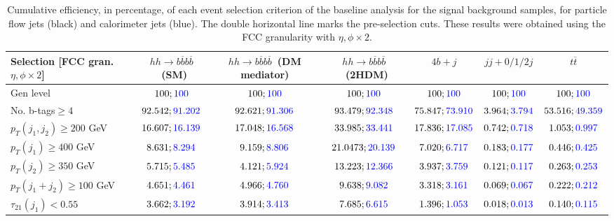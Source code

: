 \begin{landscape}
		\begin{table}
			\centering
			\caption{Cumulative efficiency, in percentage, of each event selection criterion of the baseline analysis for the signal background samples, for particle flow jets (black) and calorimeter jets (blue). The double horizontal line marks the pre-selection cuts. These results were obtained using the FCC granularity with $\eta,\phi\times 2$.}
			\begin{tabular}{lcccccc}
				\toprule 
				\textbf{Selection [FCC gran. $\eta,\phi\times2$]} & $hh\rightarrow b\overline{b}b\overline{b}$~(SM) & $hh\rightarrow b\overline{b}b\overline{b}$~(DM mediator) & $hh\rightarrow b\overline{b}b\overline{b}$~(2HDM) & $4b+j$  & $jj+0/1/2 j$ & $t\overline{t}$ \\
				\midrule
				Gen level & $100;\textcolor{blue}{100}$ & $100;\textcolor{blue}{100}$ &$100;\textcolor{blue}{100}$& $100;\textcolor{blue}{100}$& $100;\textcolor{blue}{100}$& $100;\textcolor{blue}{100}$ \\
				\rowcolor{black!7}No. b-tags$\geq 4$&$92.542;\textcolor{blue}{91.202}$&$92.621;\textcolor{blue}{91.306}$&$93.479;\textcolor{blue}{92.348}$&$75.847;\textcolor{blue}{73.910}$&$3.964;\textcolor{blue}{3.794}$&$53.516;\textcolor{blue}{49.359}$\\
				$p_T(j_1,j_2)\geq200$ GeV & $16.607;\textcolor{blue}{16.139}$ & $17.048;\textcolor{blue}{16.568}$&$33.985;\textcolor{blue}{33.441}$ &$17.836;\textcolor{blue}{17.085}$&$0.742;\textcolor{blue}{0.718}$&$1.053;\textcolor{blue}{0.997}$\\
				\midrule \midrule
				\rowcolor{black!7}$p_T(j_1)\geq 400$ GeV & $8.631;\textcolor{blue}{8.294}$ &$9.159;\textcolor{blue}{8.806}$  &$21.0473;\textcolor{blue}{20.139}$&$7.020;\textcolor{blue}{6.717}$&$0.183;\textcolor{blue}{0.177}$&$0.446;\textcolor{blue}{0.425}$\\ 
				$p_T(j_2)\geq 350$ GeV & $5.715;\textcolor{blue}{5.485}$& $4.121;\textcolor{blue}{5.924}$&$13.223;\textcolor{blue}{12.366}$&$3.937;\textcolor{blue}{3.759}$&$0.121;\textcolor{blue}{0.117}$&$0.263;\textcolor{blue}{0.253}$\\
				\rowcolor{black!7}$p_T(j_1+j_2)\geq 100$ GeV &$4.651;\textcolor{blue}{4.461}$ & $4.966;\textcolor{blue}{4.760}$ &$9.638;\textcolor{blue}{9.082}$&$3.318;\textcolor{blue}{3.161}$&$0.069;\textcolor{blue}{0.067}$&$0.222;\textcolor{blue}{0.212}$\\
				$\tau_{21}(j_1)<0.55$ & $3.662;\textcolor{blue}{3.192}$& $3.914;\textcolor{blue}{3.413}$&$7.685;\textcolor{blue}{6.615}$&$1.396;\textcolor{blue}{1.053}$&$0.018;\textcolor{blue}{0.013}$&$0.140;\textcolor{blue}{0.115}$\\

\end{tabular}
\end{table}
\end{landscape}
